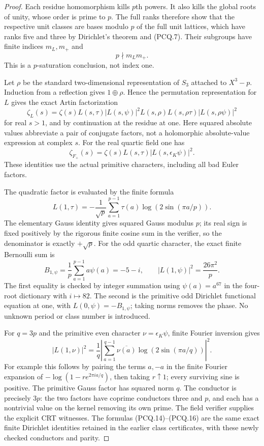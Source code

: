 \begin{proof}
Each residue homomorphism kills $p$th powers.  It also kills
the global roots of unity, whose order is prime to $p$.
The full ranks therefore show that the respective unit classes
are bases modulo $p$ of the full unit lattices, which have ranks
five and three by Dirichlet's theorem and (PCQ.7).
Their subgroups have finite indices $m_L,m_+$ and
\[
                          p\nmid m_Lm_+.
 \tag{PCQ.11}
\]
This is a $p$-saturation conclusion, not index one.

Let $\rho$ be the standard two-dimensional representation of
$S_3$ attached to $X^3-p$.  Induction from a reflection gives
$1\oplus\rho$.  Hence the permutation representation for $L$
gives the exact Artin factorization
\[
 \zeta_L(s)=\zeta(s)L(s,\tau)|L(s,\psi)|^2
              L(s,\rho)L(s,\rho\tau)|L(s,\rho\psi)|^2
 \tag{PCQ.12}
\]
for real $s>1$, and by continuation at the residue at one.
Here squared absolute values abbreviate a pair of conjugate factors,
not a holomorphic absolute-value expression at complex $s$.
For the real quartic field one has
\[
       \zeta_{F_+}(s)=\zeta(s)L(s,\tau)
                                      |L(s,\epsilon_K\psi)|^2.
 \tag{PCQ.13}
\]
These identities use the actual primitive characters, including all
bad Euler factors.

The quadratic factor is evaluated by the finite formula
\[
 L(1,\tau)=-\frac1{\sqrt p}
       \sum_{a=1}^{p-1}\tau(a)\log(2\sin(\pi a/p)).
 \tag{PCQ.14}
\]
The elementary Gauss identity gives squared Gauss modulus $p$;
its real sign is fixed positively by the rigorous finite cosine sum
in the verifier, so the denominator is exactly $+\sqrt p$.
For the odd quartic character, the exact finite Bernoulli sum is
\[
 B_{1,\psi}=\frac1p\sum_{a=1}^{p-1}a\psi(a)=-5-i,
 \qquad |L(1,\psi)|^2=\frac{26\pi^2}{p}.
 \tag{PCQ.15}
\]
The first equality is checked by integer summation using
$\psi(a)=a^{67}$ in the four-root dictionary with $i\mapsto82$.
The second is the primitive odd Dirichlet functional equation at
one, with $L(0,\psi)=-B_{1,\psi}$; taking norms removes the phase.
No unknown period or class number is introduced.

For $q=3p$ and the primitive even character $\nu=\epsilon_K\psi$,
finite Fourier inversion gives
\[
 |L(1,\nu)|^2=\frac1q\left|
     \sum_{a=1}^{q-1}\overline{\nu(a)}
                         \log(2\sin(\pi a/q))\right|^2.
 \tag{PCQ.16}
\]
For example this follows by pairing the terms $a,-a$ in the
finite Fourier expansion of $-\log(1-re^{2\pi ia/q})$,
then taking $r\uparrow1$; every surviving sine is positive.
The primitive Gauss factor has squared norm $q$.
The conductor is precisely $3p$: the two factors have coprime
conductors three and $p$, and each has a nontrivial value on the
kernel removing its own prime.  The field verifier supplies the
explicit CRT witnesses.  The formulas (PCQ.14)--(PCQ.16) are the
same exact finite Dirichlet identities retained in the earlier
class certificates, with these newly checked conductors and parity.


\end{proof}
